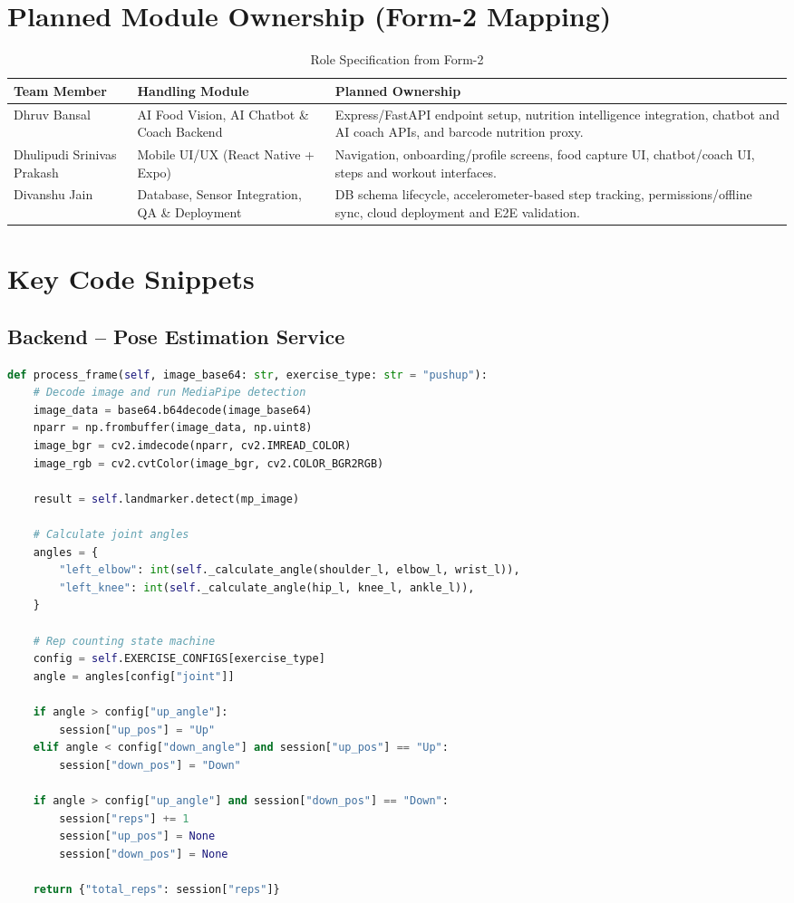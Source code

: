 \documentclass[12pt]{report}
\begin{document}
\section{Planned Module Ownership (Form-2 Mapping)}
\begin{table}[H]
\centering
\renewcommand{\arraystretch}{1.2}
\begin{tabular}{|p{3.2cm}|p{5.5cm}|p{6.3cm}|}
\hline
\textbf{Team Member} & \textbf{Handling Module} & \textbf{Planned Ownership} \\ \hline
Dhruv Bansal & AI Food Vision, AI Chatbot \& Coach Backend & Express/FastAPI endpoint setup, nutrition intelligence integration, chatbot and AI coach APIs, and barcode nutrition proxy. \\ \hline
Dhulipudi Srinivas Prakash & Mobile UI/UX (React Native + Expo) & Navigation, onboarding/profile screens, food capture UI, chatbot/coach UI, steps and workout interfaces. \\ \hline
Divanshu Jain & Database, Sensor Integration, QA \& Deployment & DB schema lifecycle, accelerometer-based step tracking, permissions/offline sync, cloud deployment and E2E validation. \\ \hline
\end{tabular}
\caption{Role Specification from Form-2}
\end{table}

\section{Key Code Snippets}
\subsection{Backend – Pose Estimation Service}
\begin{lstlisting}[language=Python, caption=Rep counting state machine]
def process_frame(self, image_base64: str, exercise_type: str = "pushup"):
    # Decode image and run MediaPipe detection
    image_data = base64.b64decode(image_base64)
    nparr = np.frombuffer(image_data, np.uint8)
    image_bgr = cv2.imdecode(nparr, cv2.IMREAD_COLOR)
    image_rgb = cv2.cvtColor(image_bgr, cv2.COLOR_BGR2RGB)
    
    result = self.landmarker.detect(mp_image)
    
    # Calculate joint angles
    angles = {
        "left_elbow": int(self._calculate_angle(shoulder_l, elbow_l, wrist_l)),
        "left_knee": int(self._calculate_angle(hip_l, knee_l, ankle_l)),
    }
    
    # Rep counting state machine
    config = self.EXERCISE_CONFIGS[exercise_type]
    angle = angles[config["joint"]]
    
    if angle > config["up_angle"]:
        session["up_pos"] = "Up"
    elif angle < config["down_angle"] and session["up_pos"] == "Up":
        session["down_pos"] = "Down"
    
    if angle > config["up_angle"] and session["down_pos"] == "Down":
        session["reps"] += 1
        session["up_pos"] = None
        session["down_pos"] = None
    
    return {"total_reps": session["reps"]}
\end{lstlisting}
\end{document}
